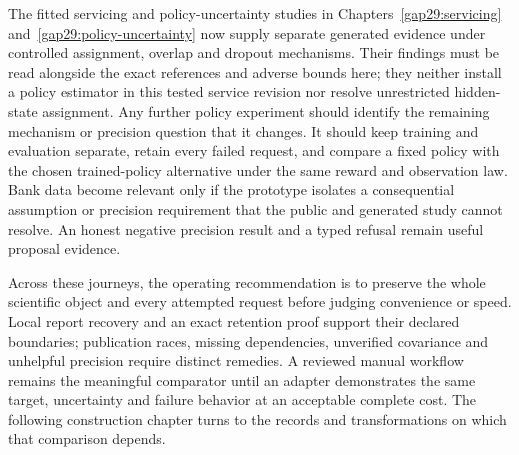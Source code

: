 The fitted servicing and policy-uncertainty studies in Chapters~\ref{gap29:servicing} and~\ref{gap29:policy-uncertainty} now supply separate generated evidence under controlled assignment, overlap and dropout mechanisms. Their findings must be read alongside the exact references and adverse bounds here; they neither install a policy estimator in this tested service revision nor resolve unrestricted hidden-state assignment. Any further policy experiment should identify the remaining mechanism or precision question that it changes. It
should keep training and evaluation separate, retain every failed request, and
compare a fixed policy with the chosen trained-policy alternative under the same
reward and observation law. Bank data become relevant only if the prototype
isolates a consequential assumption or precision requirement that the public
and generated study cannot resolve. An honest negative precision result and a typed refusal remain useful proposal evidence.

Across these journeys, the operating recommendation is to preserve the whole scientific object and every attempted request before judging convenience or speed. Local report recovery and an exact retention proof support their declared boundaries; publication races, missing dependencies, unverified covariance and unhelpful precision require distinct remedies. A reviewed manual workflow remains the meaningful comparator until an adapter demonstrates the same target, uncertainty and failure behavior at an acceptable complete cost. The following construction chapter turns to the records and transformations on which that comparison depends.

